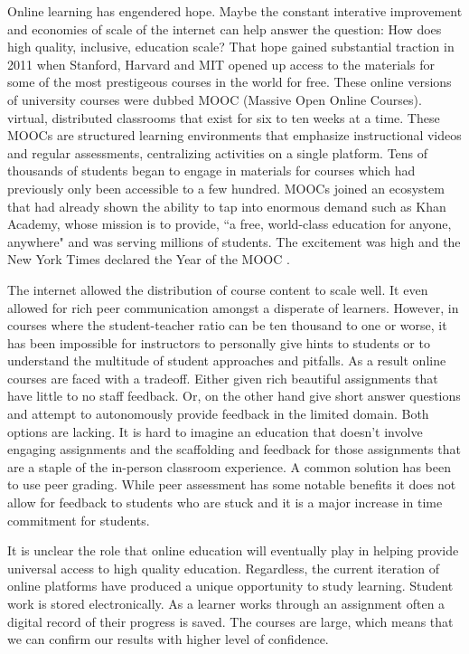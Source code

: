 Online learning has engendered hope. Maybe the constant interative improvement and economies of scale of the internet can help answer the question: How does high quality, inclusive, education scale? 
That hope gained substantial traction in 2011 when Stanford, Harvard and MIT opened up access to the materials for some of the most prestigeous courses in the world for free. These online versions of university courses were dubbed MOOC (Massive Open Online Courses).  virtual, distributed classrooms that
exist for six to ten weeks at a time. These MOOCs are
structured learning environments that emphasize instructional
videos and regular assessments, centralizing activities
on a single platform. Tens of thousands of students began to engage in materials for courses which had previously only been accessible to a few hundred. MOOCs joined an ecosystem that had already shown the ability to tap into enormous demand such as Khan Academy, whose mission is to provide, ``a free, world-class education for anyone, anywhere" and was serving millions of students. The excitement was high and the New York Times declared the Year of the MOOC \cite{}. 

The internet allowed the distribution of course content to scale well. It even allowed for rich peer communication amongst a disperate of learners. However, in courses where the student-teacher ratio can be ten thousand to one or worse, it has been impossible for instructors to personally give hints to students or to understand the multitude of student approaches and pitfalls. As a result online courses are faced with a tradeoff. Either given rich beautiful assignments that have little to no staff feedback. Or, on the other hand give short answer questions and attempt to autonomously provide feedback in the limited domain. Both options are lacking. It is hard to imagine an education that doesn't involve engaging assignments and the scaffolding and feedback for those assignments that are a staple of the in-person classroom experience. A common solution has been to use peer grading. While peer assessment has some notable benefits it does not allow for feedback to students who are stuck and it is a major increase in time commitment for students.

It is unclear the role that online education will eventually play in helping provide universal access to high quality education. Regardless, the current iteration of online platforms have produced a unique opportunity to study learning. Student work is stored electronically. As a learner works through an assignment often a digital record of their progress is saved. The courses are large, which means that we can confirm our results with higher level of confidence. 

